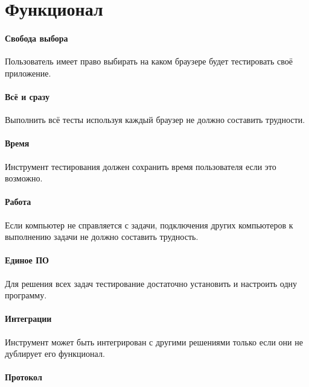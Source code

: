 \section{Функционал}

\paragraph{Свобода выбора}

Пользователь имеет право выбирать на каком браузере будет тестировать своё приложение.

\paragraph{Всё и сразу}

Выполнить всё тесты используя каждый браузер не должно составить трудности.

\paragraph{Время}

Инструмент тестирования должен сохранить время пользователя если это возможно.

\paragraph{Работа}

Если компьютер не справляется с задачи, подключения других компьютеров к выполнению задачи не должно составить трудность.

\paragraph{Единое ПО}

Для решения всех задач тестирование достаточно установить и настроить одну программу.

\paragraph{Интеграции}

Инструмент может быть интегрирован с другими решениями только если они не дублирует его функционал.

\paragraph{Протокол}

